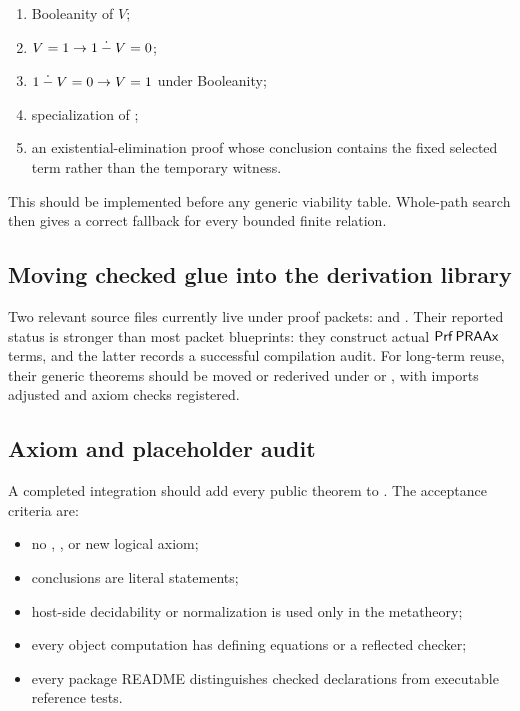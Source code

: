 \begin{enumerate}
\item Booleanity of \(V\);
\item \(V=1\to 1\mathbin{\dot{-}} V=0\);
\item \(1\mathbin{\dot{-}} V=0\to V=1\) under Booleanity;
\item specialization of ;
\item an existential-elimination proof whose conclusion contains the fixed
selected term rather than the temporary witness.
\end{enumerate}

This should be implemented before any generic viability table.  Whole-path
search then gives a correct fallback for every bounded finite relation.

\subsection{Moving checked glue into the derivation library}

Two relevant source files currently live under proof packets:
 and .  Their
reported status is stronger than most packet blueprints: they construct actual
\(\mathsf{Prf}\,\mathsf{PRAAx}\) terms, and the latter records a successful compilation audit.
For long-term reuse, their generic theorems should be moved or rederived under
 or , with imports adjusted
and axiom checks registered.

\subsection{Axiom and placeholder audit}

A completed integration should add every public theorem to
.  The acceptance
criteria are:

\begin{itemize}
\item no , , or new logical axiom;
\item conclusions are literal  statements;
\item host-side decidability or normalization is used only in the metatheory;
\item every object computation has defining equations or a reflected checker;
\item every package README distinguishes checked declarations from executable
reference tests.
\end{itemize}

